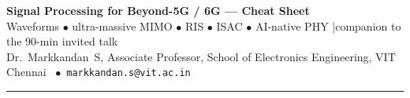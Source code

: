 \documentclass[a4paper,9pt]{extarticle}
\begin{document}
\small

\begin{center}
  {\large\bfseries Signal Processing for Beyond-5G / 6G --- Cheat Sheet}\\[1pt]
  {\footnotesize\color{accent} Waveforms $\bullet$ ultra-massive MIMO $\bullet$
   RIS $\bullet$ ISAC $\bullet$ AI-native PHY \quad|\quad companion to the
   90-min invited talk}\\[1pt]
  {\footnotesize Dr.\ Markkandan~S, Associate Professor, School of Electronics
   Engineering, VIT Chennai \ $\bullet$\ \texttt{markkandan.s@vit.ac.in}}
\end{center}
\vspace{1pt}
\hrule
\vspace{3pt}
\end{document}
